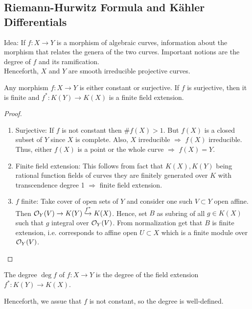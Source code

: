 \documentclass[a4paper,11pt]{article}
\begin{document}
		\subsection{Riemann-Hurwitz Formula and K{\"a}hler Differentials}\label{subsec--differentials}

			Idea: If $f:X\rightarrow Y$ is a morphism of algebraic curves, information about the morphism that relates the genera of the two curves. Important notions are the degree of $f$ and its ramification.
			\\

			\noindent Henceforth, $X$ and $Y$ are smooth irreducible projective curves.

			\begin{prop}
				Any morphism $f:X\rightarrow Y$ is either constant or surjective. If $f$ is surjective, then it is finite and $f^\ast:K(Y)\rightarrow K(X)$ is a finite field extension.
			\end{prop}
			\begin{proof}
				\begin{enumerate}
					\item Surjective: If $f$ is not constant then $\#f(X)>1$. But $f(X)$ is a closed subset of $Y$ since $X$ is complete. Also, $X$ irreducible $\Longrightarrow$ $f(X)$ irreducible. Thus, either $f(X)$ is a point or the whole curve $\Longrightarrow$ $f(X)=Y$.
					\item Finite field extension: This follows from fact that $K(X),K(Y)$ being rational function fields of curves they are finitely generated over $K$ with transcendence degree 1 $\Longrightarrow$ finite field extension.
					\item $f$ finite: Take cover of open sets of $Y$ and consider one such $V\subset Y$ open affine. Then $\mathcal{O}_Y(V)\rightarrow K(Y)\overset{f^\ast}{\hookrightarrow} K(X)$. Hence, set $B$ as subring of all $g\in K(X)$ such that $g$ integral over $\mathcal{O}_Y(V)$. From normalization get that $B$ is finite extension, i.e. corresponds to affine open $U\subset X$ which is a finite module over $\mathcal{O}_Y(V)$.		
				\end{enumerate} 
			\end{proof}

			\begin{defi}
				The degree $\deg f$ of $f:X\rightarrow Y$ is the degree of the field extension $f^\ast:K(Y)\rightarrow K(X)$.
			\end{defi}

			Henceforth, we assue that $f$ is not constant, so the degree is well-defined.
\end{document}

